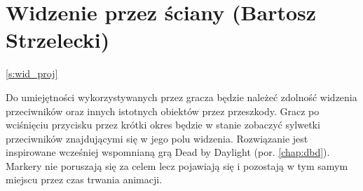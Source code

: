 \section{Widzenie przez ściany (Bartosz Strzelecki)}\ref{s:wid_proj}

Do umiejętności wykorzystywanych przez gracza będzie należeć zdolność widzenia przeciwników oraz innych istotnych obiektów przez przeszkody.
Gracz po wciśnięciu przycisku przez krótki okres będzie w stanie zobaczyć sylwetki przeciwników znajdującymi się w jego polu widzenia.
Rozwiązanie jest inspirowane wcześniej wspomnianą grą Dead by Daylight (por. \ref{chap:dbd}). Markery nie poruszają się za celem lecz pojawiają się i pozostają w tym samym miejscu przez czas trwania animacji.



